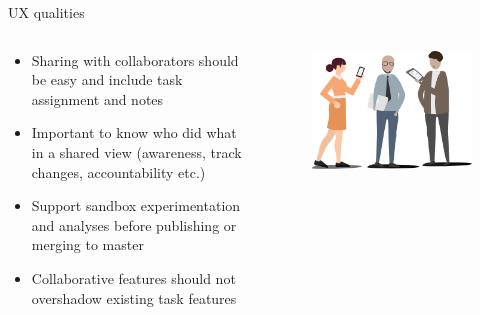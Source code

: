 \documentclass[aspectratio=169]{beamer}
\begin{document}
\begin{frame}{UX qualities}
    \begin{columns}
        \begin{column}{0.6\textwidth}
            \small
            \begin{itemize}
                \item Sharing with collaborators should be easy and include task assignment and notes
                \item Important to know who did what in a shared view (awareness, track changes, accountability etc.)
                \item Support sandbox experimentation and analyses before publishing or merging to master
                \item Collaborative features should not overshadow existing task features
            \end{itemize}
        \end{column}
        \begin{column}{0.4\textwidth}
            \begin{figure}[h]
                \centering
                \includegraphics[width=1\textwidth]{images/Users.png}
            \end{figure}
        \end{column}
    \end{columns}
\end{frame}
\end{document}
